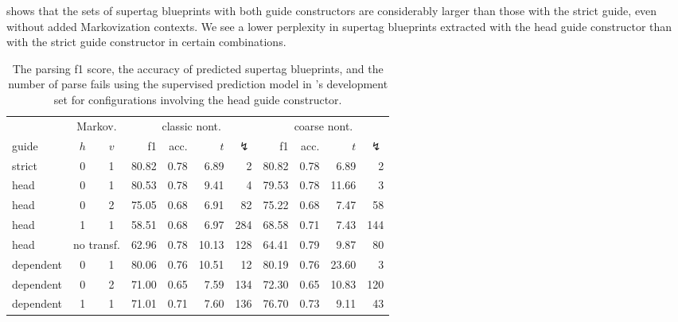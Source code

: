 \documentclass[../../document.tex]{subfiles}
\begin{document}
     shows that the sets of supertag blueprints with both guide constructors are considerably larger than those with the strict guide, even without added Markovization contexts.
    We see a lower perplexity in supertag blueprints extracted with the head guide constructor than with the strict guide constructor in certain combinations.

    
    \begin{table}
        \caption{\label{tbl:gridsearch:head:2}
        The parsing f1 score, the accuracy of predicted supertag blueprints, and the number of parse fails using the supervised prediction model in \negra{}'s development set for configurations involving the head guide constructor.
        }
        \centering
        \vspace{.2cm}
        \begin{tabular}{lcc|rrrr|rrrr}
            \toprule
            & \multicolumn{2}{c|}{Markov.} & \multicolumn{4}{c|}{classic nont.} &  \multicolumn{4}{c}{coarse nont.} \\
guide           & \(h\) & \(v\) & f1 & acc. & $t$ & $\lightning$ & f1 & acc. & $t$ & $\lightning$  \\ \hline \rowcolor{black!10}
strict & 0 & 1                         & 80.82 & 0.78 &  6.89 &   2 & 80.82 & 0.78 &  6.89 &   2 \\  \hline
head & 0 & 1                           & 80.53 & 0.78 &  9.41 &   4 & 79.53 & 0.78 & 11.66 &   3 \\
head & 0 & 2                           & 75.05 & 0.68 &  6.91 &  82 & 75.22 & 0.68 &  7.47 &  58 \\
head & 1 & 1                           & 58.51 & 0.68 &  6.97 & 284 & 68.58 & 0.71 &  7.43 & 144 \\
head & \multicolumn{2}{c|}{no transf.} & 62.96 & 0.78 & 10.13 & 128 & 64.41 & 0.79 &  9.87 &  80 \\\hline
dependent & 0 & 1                      & 80.06 & 0.76 & 10.51 &  12 & 80.19 & 0.76 & 23.60 &   3 \\
dependent & 0 & 2                      & 71.00 & 0.65 &  7.59 & 134 & 72.30 & 0.65 & 10.83 & 120 \\
dependent & 1 & 1                      & 71.01 & 0.71 &  7.60 & 136 & 76.70 & 0.73 &  9.11 &  43 \\
\bottomrule
        \end{tabular}
    \end{table}
\end{document}
